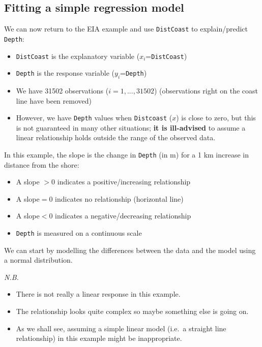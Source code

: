 \documentclass[
  oneside]{krantz}
\providecommand{\tightlist}{%
  \setlength{\itemsep}{0pt}\setlength{\parskip}{0pt}}
\begin{document}
\hypertarget{fitting-a-simple-regression-model}{%
\subsection{Fitting a simple regression model}\label{fitting-a-simple-regression-model}}

We can now return to the EIA example and use \texttt{DistCoast} to explain/predict \texttt{Depth}:

\begin{itemize}
\tightlist
\item
  \texttt{DistCoast} is the explanatory variable (\(x_i\)=\texttt{DistCoast})
\item
  \texttt{Depth} is the response variable (\(y_i\)=\texttt{Depth})
\item
  We have 31502 observations (\(i=1,...,31502\)) (observations right on the coast line have been removed)
\item
  However, we have \texttt{Depth} values when \texttt{Distcoast} (\(x\)) is close to zero, but this is not guaranteed in many other situations; \textbf{it is ill-advised} to assume a linear relationship holds outside the range of the observed data.
\end{itemize}

In this example, the slope is the change in \texttt{Depth} (in m) for a 1 km increase in distance from the shore:

\begin{itemize}
\tightlist
\item
  A slope \(>0\) indicates a positive/increasing relationship
\item
  A slope\(=0\) indicates no relationship (horizontal line)
\item
  A slope\(<0\) indicates a negative/decreasing relationship
\item
  \texttt{Depth} is measured on a continuous scale
\end{itemize}

We can start by modelling the differences between the data and the model using a normal distribution.

\emph{N.B.}

\begin{itemize}
\tightlist
\item
  There is not really a linear response in this example.
\item
  The relationship looks quite complex so maybe something else is going on.
\item
  As we shall see, assuming a simple linear model (i.e.~a straight line relationship) in this example might be inappropriate.
\end{itemize}
\end{document}
